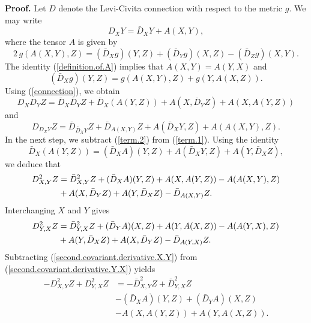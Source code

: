 \documentclass[11pt]{amsart}
\theoremstyle{definition}
\begin{document}
\textbf{Proof.} 
Let $D$ denote the Levi-Civita connection with respect to the metric $g$. We may write 
\begin{equation} 
\label{connection}
D_X Y = \bar{D}_X Y + A(X,Y), 
\end{equation}
where the tensor $A$ is given by 
\begin{equation} 
\label{definition.of.A} 
2 \, g(A(X,Y),Z) = (\bar{D}_X g)(Y,Z) + (\bar{D}_Y g)(X,Z) - (\bar{D}_Z g)(X,Y). 
\end{equation}
The identity (\ref{definition.of.A}) implies that $A(X,Y) = A(Y,X)$ and 
\begin{equation} 
\label{covariant.derivative.of.g}
(\bar{D}_X g)(Y,Z) = g(A(X,Y),Z) + g(Y,A(X,Z)). 
\end{equation}
Using (\ref{connection}), we obtain 
\begin{equation} 
\label{term.1}
D_X D_Y Z = \bar{D}_X \bar{D}_Y Z + \bar{D}_X(A(Y,Z)) + A(X,\bar{D}_Y Z) + A(X,A(Y,Z)) 
\end{equation}
and 
\begin{equation} 
\label{term.2}
D_{D_X Y} Z = \bar{D}_{\bar{D}_X Y} Z + \bar{D}_{A(X,Y)} Z + A(\bar{D}_X Y,Z) + A(A(X,Y),Z). 
\end{equation}
In the next step, we subtract (\ref{term.2}) from (\ref{term.1}). Using the identity 
\[\bar{D}_X(A(Y,Z)) = (\bar{D}_X A)(Y,Z) + A(\bar{D}_X Y,Z) + A(Y,\bar{D}_X Z),\] 
we deduce that 
\begin{align} 
\label{second.covariant.derivative.X.Y}
D_{X,Y}^2 Z 
&= \bar{D}_{X,Y}^2 Z + (\bar{D}_X A)(Y,Z) + A(X,A(Y,Z)) - A(A(X,Y),Z) \notag \\ 
&+ A(X,\bar{D}_Y Z) + A(Y,\bar{D}_X Z) - \bar{D}_{A(X,Y)} Z. 
\end{align}
Interchanging $X$ and $Y$ gives 
\begin{align} 
\label{second.covariant.derivative.Y.X}
D_{Y,X}^2 Z 
&= \bar{D}_{Y,X}^2 Z + (\bar{D}_Y A)(X,Z) + A(Y,A(X,Z)) - A(A(Y,X),Z) \notag \\ 
&+ A(Y,\bar{D}_X Z) + A(X,\bar{D}_Y Z) - \bar{D}_{A(Y,X)} Z. 
\end{align}
Subtracting (\ref{second.covariant.derivative.X.Y}) from (\ref{second.covariant.derivative.Y.X}) yields 
\begin{align*} 
-D_{X,Y}^2 Z + D_{Y,X}^2 Z 
&= -\bar{D}_{X,Y}^2 Z + \bar{D}_{Y,X}^2 Z \\ 
&- (\bar{D}_X A)(Y,Z) + (\bar{D}_Y A)(X,Z) \\ 
&- A(X,A(Y,Z)) + A(Y,A(X,Z)). 
\end{align*}
\end{document}
